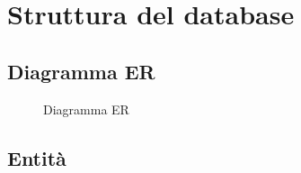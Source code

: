\section{Struttura del database}

\subsection{Diagramma ER}
    \begin{figure}[h]
        \centering
        \caption{Diagramma ER}
        \label{fig:diagramma_er}
    \end{figure}

\subsection{Entità}
